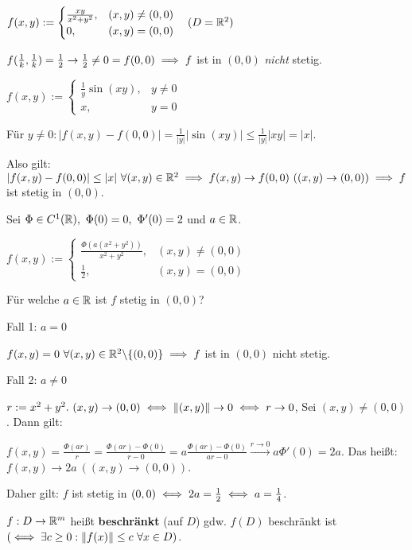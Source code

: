 \documentclass[a4paper,twoside,DIV15,BCOR12mm,chapterprefix=true,headings=twolinechapter]{scrbook}
\begin{document}
\begin{beispiele}
\item $f(x,y) := \begin{cases}
\frac{xy}{x^2+y^2}, & (x,y) \ne (0,0)\\
0,                  & (x,y) = (0,0)
\end{cases}\quad(D = \mathbb{R}^2)$

$f(\frac{1}{k},\frac{1}{k}) = \frac{1}{2} \to \frac{1}{2} \ne 0 = f(0,0) \implies f$ ist in $(0,0)$ \emph{nicht} stetig.

\item $f(x,y) := \begin{cases}
\frac{1}{y} \sin(xy), & y \ne 0\\
x,                    & y = 0
\end{cases}$

Für $y \ne 0: |f(x,y) - f(0,0)| = \frac{1}{|y|}|\sin(xy)| \le \frac{1}{|y|}|xy| = |x|.$

Also gilt: $|f(x,y) - f(0,0)| \le |x|\ \forall (x,y) \in \MdR^2 \folgt f(x,y) \to f(0,0)\ ((x,y) \to (0,0)) \folgt f$ ist stetig in $(0,0)$.

\item Sei $\Phi \in C^1(\MdR),\ \Phi(0) = 0,\ \Phi'(0) = 2$ und $a \in \mathbb{R}$.

$f(x,y) := \begin{cases}
\frac{\Phi(a(x^2+y^2))}{x^2+y^2}, & (x,y) \ne (0,0)\\
\frac{1}{2},                      & (x,y) = (0,0)
\end{cases}$

Für welche $a \in \mathbb{R}$ ist $f$ stetig in $(0,0)$?

Fall 1: $a = 0$

$f(x,y) = 0\ \forall(x,y) \in \mathbb{R}^2\backslash\{(0,0)\} \implies f$ ist in $(0,0)$ nicht stetig.

Fall 2: $a \ne 0$

$r := x^2 + y^2.\ (x,y) \to (0,0) \iff \|(x,y)\| \to 0 \iff r \to 0$, Sei $(x,y) \ne (0,0)$. Dann gilt:

$f(x,y) = \frac{\Phi(ar)}{r} = \frac{\Phi(ar) - \Phi(0)}{r - 0} = a \frac{\Phi(ar) - \Phi(0)}{ar - 0} \overset{r \to 0}{\to} a \Phi'(0) = 2a$. Das heißt: $f(x,y) \to 2a\ ((x,y)\to(0,0))$.

Daher gilt: $f$ ist stetig in $(0,0) \iff 2a = \frac{1}{2} \iff a = \frac{1}{4}$.
\end{beispiele}

\begin{definition*}
$f:D \to \mathbb{R}^m$ heißt \textbf{beschränkt} (auf $D$) gdw. $f(D)$ beschränkt ist $(\iff \exists c \ge 0: \|f(x)\| \le c\ \forall x \in D)$.
\end{definition*}
\end{document}
